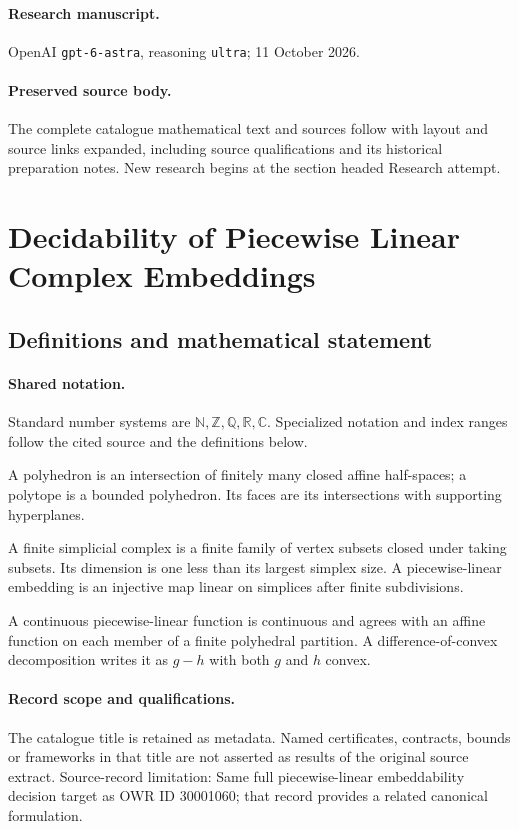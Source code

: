 \documentclass[11pt]{article}
\begin{document}
\paragraph{Research manuscript.} OpenAI \texttt{gpt-6-astra}, reasoning \texttt{ultra}; 11 October 2026.
\paragraph{Preserved source body.} The complete catalogue mathematical text and sources follow with layout and source links expanded, including source qualifications and its historical preparation notes. New research begins at the section headed Research attempt.

\section{Decidability of Piecewise Linear Complex Embeddings}\label{statement}

\subsection{Definitions and mathematical statement}

\paragraph{Shared notation.}Standard number systems are $\mathbb N,\mathbb Z,\mathbb Q,\mathbb R,\mathbb C$. Specialized notation and index ranges follow the cited source and the definitions below.


A polyhedron is an intersection of finitely many closed affine half-spaces; a polytope is a bounded polyhedron. Its faces are its intersections with supporting hyperplanes.

A finite simplicial complex is a finite family of vertex subsets closed under taking subsets. Its dimension is one less than its largest simplex size. A piecewise-linear embedding is an injective map linear on simplices after finite subdivisions.

A continuous piecewise-linear function is continuous and agrees with an affine function on each member of a finite polyhedral partition. A difference-of-convex decomposition writes it as $g-h$ with both $g$ and $h$ convex.
\paragraph{Record scope and qualifications.}
The catalogue title is retained as metadata. Named certificates, contracts, bounds or frameworks in that title are not asserted as results of the original source extract.
Source-record limitation: Same full piecewise-linear embeddability decision target as OWR ID 30001060; that record provides a related canonical formulation.
\end{document}
